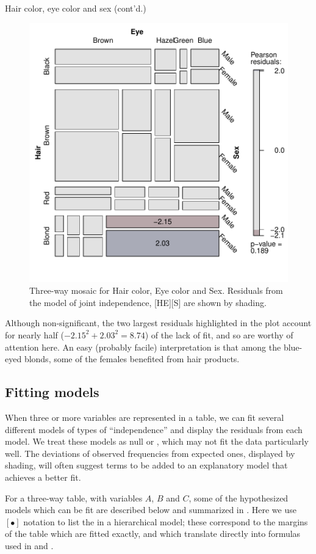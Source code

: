 \documentclass[10pt,krantz2]{krantz}\usepackage[]{graphicx}\usepackage[]{color}
\newenvironment{knitrout}{}{} %
\renewenvironment{knitrout}{\small\renewcommand{\baselinestretch}{.85}}{} %
\begin{document}
\begin{Example}[HEC2]{Hair color, eye color and sex (cont'd.)}
\begin{knitrout}
\begin{figure}[!htb]
\centerline{\includegraphics[width=.7\textwidth]{ch05/fig/HEC-mos1-1} }

\caption[Three-way mosaic for Hair color, Eye color and Sex]{Three-way mosaic for Hair color, Eye color and Sex. Residuals from the model of joint independence, [HE][S] are shown by shading.}\label{fig:HEC-mos1}
\end{figure}


\end{knitrout}
Although non-significant, the two largest residuals
highlighted in the plot account for nearly half
($-2.15^2 + 2.03^2 = 8.74$) of the lack of fit, and so are worthy
of attention here.  An easy (probably facile) interpretation is
that among the blue-eyed blonds, some of the females benefited from
hair products.
\end{Example}

\subsection{Fitting models}\label{sec:mosaic-fitting}
When three or more variables are
represented in a table, we can fit several different models of types of
``independence'' and display the residuals from each model.  We treat
these models as null or , which may not fit the data
particularly well.  The deviations of observed frequencies from
expected ones, displayed by shading, will often suggest terms to be added
to an explanatory model that achieves a better fit.

For a three-way table, with variables $A$, $B$ and $C$, some of the hypothesized models which can be fit are
described below and summarized in .
Here we use $[\bullet]$ notation to list the  in
a hierarchical \loglin model; these correspond to the margins
of the table which are fitted exactly, and which translate
directly into \R formulas used in  and
.
\end{document}
